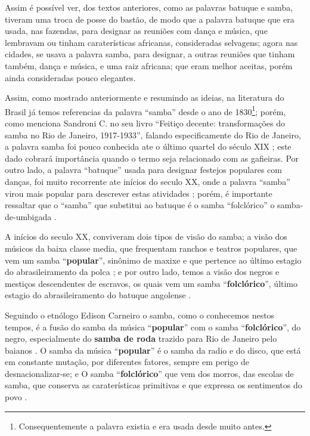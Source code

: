 Assim é possível ver, dos textos anteriores, como as palavras batuque e samba, 
tiveram uma troca de posse do bastão,
de modo que a palavra batuque que era usada, nas fazendas, 
para designar as reuniões com dança e música,
que lembravam ou tinham caraterísticas africanas, consideradas selvagens;
agora nas cidades, se usava a palavra samba, para designar,
a outras reuniões que tinham também, dança e música, 
e uma raiz africana; que eram melhor aceitas, porém ainda consideradas pouco elegantes. 





Assim, como mostrado anteriormente e resumindo as ideias, 
na literatura do Brasil já temos referencias da palavra ``samba'' desde o ano de 1830\footnote{
Consequentemente a palavra existia e era usada desde muito antes.}; 
porém, como menciona Sandroni C. no seu livro ``Feitiço decente: transformações do samba no Rio de Janeiro, 1917-1933'', 
falando especificamente do Rio de Janeiro, 
a palavra samba foi pouco conhecida ate o último quartel do século XIX \cite[pp. 86]{sandroni2001feitico};
este dado cobrará importância quando o termo seja relacionado com as gafieiras.
Por outro lado, a palavra  ``batuque'' usada para designar festejos populares com danças, 
foi muito recorrente ate inícios do seculo XX, 
onde a palavra ``samba'' virou mais popular para descrever estas atividades \cite[pp. 85]{sandroni2001feitico} \cite[pp. 47]{diniz2008almanaque}; porém,
é importante ressaltar que o ``samba'' que substitui ao batuque 
é o samba ``folclórico'' o samba-de-umbigada  \cite[pp. 96]{sandroni2001feitico}.

A inícios do seculo XX, 
conviveram dois tipos de visão do samba;
a visão dos músicos da baixa classe media, que frequentam ranchos e teatros populares, 
que vem um samba ``\textbf{popular}'', 
sinônimo de maxixe e que pertence ao último estagio 
do abrasileiramento da polca  \cite[pp. 139]{sandroni2001feitico}; e
por outro lado, temos a visão dos negros e mestiços descendentes de escravos,
os quais vem um samba ``\textbf{folclórico}'', 
último estagio do abrasileiramento do batuque angolense \cite[pp. 139]{sandroni2001feitico}.

Seguindo o etnólogo Edison Carneiro o samba, como o conhecemos nestos tempos,
é a fusão do samba da música ``\textbf{popular}'' com o samba  ``\textbf{folclórico}'', 
do negro, especialmente do \textbf{samba de roda} trazido para Rio de Janeiro pelo baianos \cite[pp. 21]{jornalsambaderoda1}.
O samba da música ``\textbf{popular}'' é o samba da radio e do disco, que está em constante mutação,
por diferentes fatores, sempre em perigo de desnacionalizar-se; e O samba   ``\textbf{folclórico}''
que vem dos morros, das escolas de samba, que conserva as caraterísticas primitivas e
que expressa os sentimentos do povo \cite[pp. 21]{jornalsambaderoda1}.


